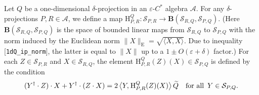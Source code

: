 \hypertarget{def:ha-map}{}%
\begin{definition}\label{def:ha-map}
Let $Q$ be a one-dimensional $\delta$-projection in an $\varepsilon$-$C^*$ algebra $\mathcal{A}$. For any $\delta$-projections $P,R\in\mathcal{A}$, we define a map $\mathrm{H}^{Q}_{P,R}\colon\mathcal{S}_{P,R}\to\mathbf{B}(\mathcal{S}_{R,Q},\mathcal{S}_{P,Q})$. (Here $\mathbf{B}(\mathcal{S}_{R,Q},\mathcal{S}_{P,Q})$ is the space of bounded linear maps from $\mathcal{S}_{R,Q}$ to $\mathcal{S}_{P,Q}$ with the norm induced by the Euclidean norm $\|X\|_\mathrm{E}=\sqrt{\langle{X},{X}\rangle}$. Due to inequality \textup{[\texttt{1dQ\_ip\_norm}]}, the latter is equal to $\|X\|$ up to a $1\pm O(\varepsilon+\delta)$ factor.) For each $Z\in\mathcal{S}_{P,R}$ and $X\in\mathcal{S}_{R,Q}$, the element $\mathrm{H}^{Q}_{P,R}(Z)(X)\in\mathcal{S}_{P,Q}$ is defined by the condition
\begin{equation*}
(Y^\dagger\cdot Z)\cdot X+Y^\dagger\cdot(Z\cdot X)
=2\,\bigl\langle{Y},\mkern1mu{\mathrm{H}^{Q}_{P,R}(Z)(X)}\bigr\rangle\,\widetilde{Q}\quad \text{for all }\,Y\in\mathcal{S}_{P,Q}.
\end{equation*}
\end{definition}
